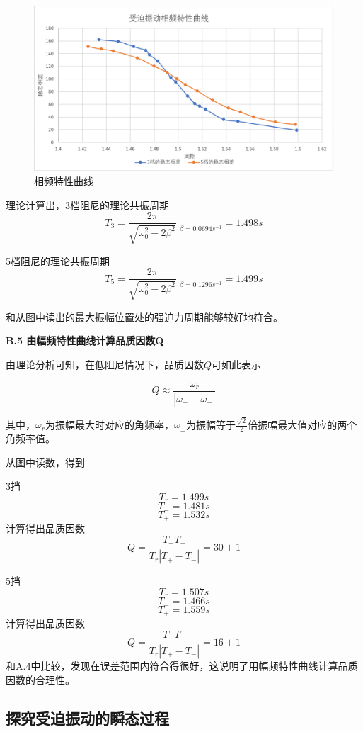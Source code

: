 \documentclass[a4paper,11pt]{article}
\begin{document}
        \begin{figure}[ht]
            \centering
            \includegraphics[scale=0.5]{相频特性曲线.png}
            \caption{相频特性曲线}
            \label{fig: 相频特性曲线}
        \end{figure}

        理论计算出，3档阻尼的理论共振周期
        $$
            T_3 = \frac{2\pi}{\sqrt{\omega_0^2-2\beta^2}}\Bigg|_{\beta = 0.0694s^{-1}} =  1.498s
        $$

        5档阻尼的理论共振周期
        $$
            T_5 = \frac{2\pi}{\sqrt{\omega_0^2-2\beta^2}}\Bigg|_{\beta = 0.1296s^{-1}} =  1.499s
        $$

        和从图中读出的最大振幅位置处的强迫力周期能够较好地符合。

        \textbf{B.5 由幅频特性曲线计算品质因数Q}

        由理论分析可知，在低阻尼情况下，品质因数$Q$可如此表示

        \begin{equation}
            Q \approx \frac{\omega_r}{|\omega_+-\omega_-|}
        \end{equation}

        其中，$\omega_r$为振幅最大时对应的角频率，$\omega_\pm$为振幅等于$\frac{\sqrt{2}}2$倍振幅最大值对应的两个角频率值。

        从图中读数，得到

        3挡
        $$
            T_r = 1.499s
        $$
        $$
            T_- = 1.481s
        $$
        $$
            T_+ = 1.532s
        $$
        计算得出品质因数
        $$
            Q = \frac{T_-T_+}{T_r|T_+-T_-|} = 30 \pm 1
        $$
        
        5挡
        $$
            T_r = 1.507s
        $$
        $$
            T_- = 1.466s
        $$
        $$
            T_+ = 1.559s
        $$
        计算得出品质因数
        $$
            Q = \frac{T_-T_+}{T_r|T_+-T_-|} = 16 \pm 1
        $$
        和A.4中比较，发现在误差范围内符合得很好，这说明了用幅频特性曲线计算品质因数的合理性。

    \subsection{探究受迫振动的瞬态过程}


    
\end{document}
